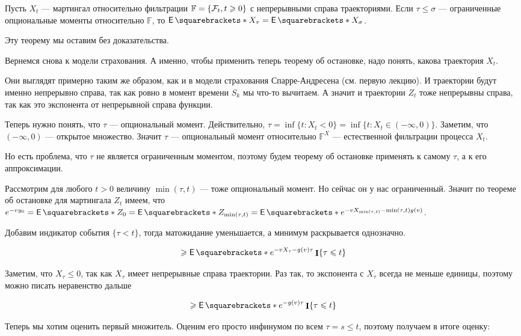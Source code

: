 \begin{theorem}
  Пусть $X_t$ --- мартингал относительно фильтрации $\mathbb{F} = \{\mathcal{F}_t, t \geqslant 0\}$
  с непрерывными справа траекториями. Если $\tau \leq \sigma$ --- ограниченные
  опциональные моменты относительно $\mathbb{F}$, то $\E{X_\tau} = \E{X_\sigma}$.
\end{theorem}

Эту теорему мы оставим без доказательства.

Вернемся снова к модели страхования. А именно, чтобы применить теперь теорему
об остановке, надо понять, какова траектория $X_t$.

Они выглядят примерно таким же образом, как и в модели страхования Спарре-Андресена
(см. первую лекцию). И траектории будут именно непрерывно справа, так как ровно
в момент времени $S_k$ мы что-то вычитаем. А значит и траектории $Z_t$ тоже
непрерывны справа, так как это экспонента от непрерывной справа функции.

Теперь нужно понять, что $\tau$ --- опциональный момент. Действительно,
$\tau = \inf\{t : X_t < 0\} = \inf\{t: X_t \in (-\infty, 0)\}$. Заметим,
что $(-\infty, 0)$ --- открытое множество. Значит $\tau$ --- опциональный
момент относительно $\mathbb{F}^X$ --- естественной фильтрации процесса $X_t$.

Но есть проблема, что $\tau$ не является ограниченным моментом, поэтому будем
теорему об остановке применять к самому $\tau$, а к его аппроксимации.

Рассмотрим для любого $t > 0$ величину $\min(\tau, t)$ --- тоже опциональный момент.
Но сейчас он у нас ограниченный. Значит по теореме об остановке для мартингала
$Z_t$ имеем, что $e^{-vy_0} = \E{Z_0} = \E{Z_{\min(\tau, t)}} =
\E{e^{-vX_{\min(\tau, t)} - \min(\tau, t)g(v)}}$. 

Добавим индикатор события $\{\tau < t\}$, тогда матожидание уменьшается, а минимум
раскрывается однозначно.

\[
  \geq \E{e^{-vX_\tau - g(v)\tau} \I\{\tau \leq t\}}
\]

Заметим, что $X_\tau \leq 0$, так как $X_\tau$ имеет непрерывные справа траектории.
Раз так, то экспонента с $X_\tau$ всегда не меньше единицы, поэтому можно писать
неравенство дальше

\[
  \geq \E{e^{-g(v)\tau} \I\{\tau \leq t\}}
\] 

Теперь мы хотим оценить первый множитель. Оценим его просто инфинумом по всем
$\tau = s \leq t$, поэтому получаем в итоге оценку:

